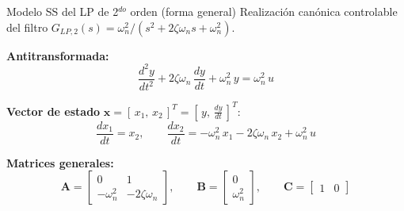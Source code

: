 \documentclass[aspectratio=169,t]{beamer}
\begin{document}
\begin{frame}{Modelo SS del LP de 2$^{do}$ orden (forma general)}
{\small\color{uncGray}Realización canónica controlable del filtro $G_{LP,2}(s)=\omega_n^2/(s^2+2\zeta\omega_n s + \omega_n^2)$.}\par
\vspace{2mm}

\textbf{Antitransformada:}
\begin{equation*}
\frac{d^2y}{dt^2} + 2\zeta\omega_n\,\frac{dy}{dt} + \omega_n^{2}\,y = \omega_n^{2}\,u
\end{equation*}

\textbf{Vector de estado} $\bm{x} = [\,x_1,\,x_2\,]^T = [\,y,\,\frac{dy}{dt}\,]^T$:
\begin{equation*}
\frac{dx_1}{dt} = x_2,
\qquad
\frac{dx_2}{dt} = -\omega_n^{2}\,x_1 - 2\zeta\omega_n\,x_2 + \omega_n^{2}\,u
\end{equation*}

\textbf{Matrices generales:}
\begin{equation*}
\bm{A} = \begin{bmatrix} 0 & 1 \\ -\omega_n^{2} & -2\zeta\omega_n \end{bmatrix},
\qquad
\bm{B} = \begin{bmatrix} 0 \\ \omega_n^{2} \end{bmatrix},
\qquad
\bm{C} = \begin{bmatrix} 1 & 0 \end{bmatrix}
\end{equation*}
\end{frame}
\end{document}
